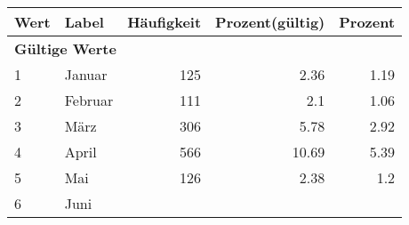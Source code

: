      \begin{longtable}{lXrrr}
     \toprule
     \textbf{Wert} & \textbf{Label} & \textbf{Häufigkeit} & \textbf{Prozent(gültig)} & \textbf{Prozent} \\
     \endhead
     \midrule
     \multicolumn{5}{l}{\textbf{Gültige Werte}}\\

     1 &
     \multicolumn{1}{X}{ Januar   } &


       \num{125} &
       \num[round-mode=places,round-precision=2]{2.36} &
         \num[round-mode=places,round-precision=2]{1.19} \\

     2 &
     \multicolumn{1}{X}{ Februar   } &


       \num{111} &
       \num[round-mode=places,round-precision=2]{2.1} &
         \num[round-mode=places,round-precision=2]{1.06} \\

     3 &
     \multicolumn{1}{X}{ März   } &


       \num{306} &
       \num[round-mode=places,round-precision=2]{5.78} &
         \num[round-mode=places,round-precision=2]{2.92} \\

     4 &
     \multicolumn{1}{X}{ April   } &


       \num{566} &
       \num[round-mode=places,round-precision=2]{10.69} &
         \num[round-mode=places,round-precision=2]{5.39} \\

     5 &
     \multicolumn{1}{X}{ Mai   } &


       \num{126} &
       \num[round-mode=places,round-precision=2]{2.38} &
         \num[round-mode=places,round-precision=2]{1.2} \\

     6 &
     \multicolumn{1}{X}{ Juni   } &



\end{longtable}
